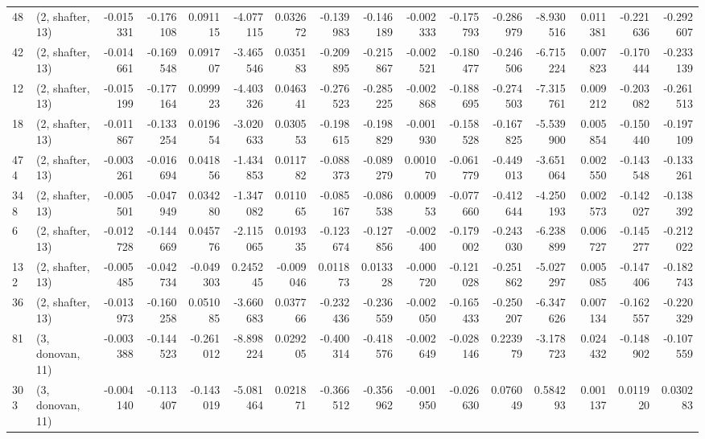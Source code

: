\begin{tabular}{llrrrrrrrrrrrrrr}
48  &  (2, shafter, 13) &  -0.015331 & -0.176108 &  0.091115 &   -4.077115 &  0.032672 &  -0.139983 & -0.146189 & -0.002333 & -0.175793 & -0.286979 &   -8.930516 &  0.011381 & -0.221636 & -0.292607 \\
42  &  (2, shafter, 13) &  -0.014661 & -0.169548 &  0.091707 &   -3.465546 &  0.035183 &  -0.209895 & -0.215867 & -0.002521 & -0.180477 & -0.246506 &   -6.715224 &  0.007823 & -0.170444 & -0.233139 \\
12  &  (2, shafter, 13) &  -0.015199 & -0.177164 &  0.099923 &   -4.403326 &  0.046341 &  -0.276523 & -0.285225 & -0.002868 & -0.188695 & -0.274503 &   -7.315761 &  0.009212 & -0.203082 & -0.261513 \\
18  &  (2, shafter, 13) &  -0.011867 & -0.133254 &  0.019654 &   -3.020633 &  0.030553 &  -0.198615 & -0.198829 & -0.001930 & -0.158528 & -0.167825 &   -5.539900 &  0.005854 & -0.150440 & -0.197109 \\
474 &  (2, shafter, 13) &  -0.003261 & -0.016694 &  0.041856 &   -1.434853 &  0.011782 &  -0.088373 & -0.089279 &  0.001070 & -0.061779 & -0.449013 &   -3.651064 &  0.002550 & -0.143548 & -0.133261 \\
348 &  (2, shafter, 13) &  -0.005501 & -0.047949 &  0.034280 &   -1.347082 &  0.011065 &  -0.085167 & -0.086538 &  0.000953 & -0.077660 & -0.412644 &   -4.250193 &  0.002573 & -0.142027 & -0.138392 \\
6   &  (2, shafter, 13) &  -0.012728 & -0.144669 &  0.045776 &   -2.115065 &  0.019335 &  -0.123674 & -0.127856 & -0.002400 & -0.179002 & -0.243030 &   -6.238899 &  0.006727 & -0.145277 & -0.212022 \\
132 &  (2, shafter, 13) &  -0.005485 & -0.042734 & -0.049303 &    0.245245 & -0.009046 &   0.011873 &  0.013328 & -0.000720 & -0.121028 & -0.251862 &   -5.027297 &  0.005085 & -0.147406 & -0.182743 \\
36  &  (2, shafter, 13) &  -0.013973 & -0.160258 &  0.051085 &   -3.660683 &  0.037766 &  -0.232436 & -0.236559 & -0.002050 & -0.165433 & -0.250207 &   -6.347626 &  0.007134 & -0.162557 & -0.220329 \\
81  &  (3, donovan, 11) &  -0.003388 & -0.144523 & -0.261012 &   -8.898224 &  0.029205 &  -0.400314 & -0.418576 & -0.002649 & -0.028146 &  0.223979 &   -3.178723 &  0.024432 & -0.148902 & -0.107559 \\
303 &  (3, donovan, 11) &  -0.004140 & -0.113407 & -0.143019 &   -5.081464 &  0.021871 &  -0.366512 & -0.356962 & -0.001950 & -0.026630 &  0.076049 &    0.584293 &  0.001137 &  0.011920 &  0.030283 \\

\end{tabular}
